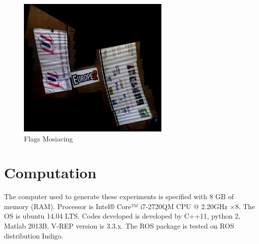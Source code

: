 \begin{figure}[H]
  \centering
  \includegraphics[width=0.65\textwidth]{figures/practical/mosaic_practical.jpg}
  
  \caption{Flags Mosiacing}
  
  \label{fig:mosaic_practical}
  
\end{figure}


\section{Computation} \label{computation}
The computer used to generate these experiments is specified with 8 GB of memory (RAM). Processor is Intel® Core™ i7-2720QM CPU @ 2.20GHz ×8. 
The OS is ubuntu 14.04 LTS. Codes developed is developed by C++11, python 2, Matlab 2013B. V-REP version is 3.3.x. The ROS package is tested on ROS distribution Indigo.